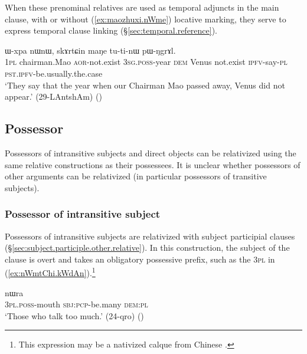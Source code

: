 When these prenominal relatives are used as temporal adjuncts in the main clause, with or without (\ref{ex:maozhuxi.nWme}) locative marking, they serve to express temporal clause linking (§\ref{sec:temporal.reference}).

\begin{exe}
\ex \label{ex:maozhuxi.nWme}
 ɯ-xpa nɯnɯ, skɤrtɕin maŋe tu-ti-nɯ pɯ-ŋgrɤl. \\
\textsc{1pl} chairman.Mao \textsc{aor}-not.exist \textsc{3sg}.\textsc{poss}-year \textsc{dem} Venus not.exist \textsc{ipfv}-say-\textsc{pl} \textsc{pst}.\textsc{ipfv}-be.usually.the.case \\
\glt `They say that the year when our Chairman Mao passed away, Venus did not appear.' (29-LAntshAm)
()
\end{exe}
 

\subsection{Possessor} \label{sec:possessor.relativization}
Possessors of intransitive subjects and direct objects can be relativized using the same relative constructions as their possessees. It is unclear whether possessors of other arguments can be relativized (in particular possessors of transitive subjects).

\subsubsection{Possessor of intransitive subject}  \label{sec:S.possessor.relativization}
Possessors of intransitive subjects are relativized with subject participial clauses (§\ref{sec:subject.participle.other.relative}). In this construction, the subject of the clause is overt and takes an obligatory possessive prefix, such as the \textsc{3pl}  in (\ref{ex:nWmtChi.kWdAn}).\footnote{This expression may be a nativized calque from Chinese . }

\begin{exe}
\ex \label{ex:nWmtChi.kWdAn}
 nɯra \\
\textsc{3pl}.\textsc{poss}-mouth \textsc{sbj}:\textsc{pcp}-be.many \textsc{dem}:\textsc{pl} \\
\glt `Those who talk too much.' (24-qro)
()
\end{exe}

